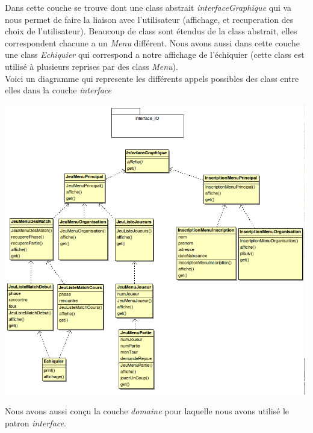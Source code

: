 \documentclass[10pt,a4paper]{report}
\begin{document}
Dans cette couche se trouve dont une class abstrait \textit{interfaceGraphique} qui va nous permet de faire la liaison avec l'utilisateur (affichage, et recuperation des choix de l'utilisateur). Beaucoup de class sont étendus de la class abstrait, elles correspondent chacune a un \textit{Menu} différent. Nous avons aussi dans cette couche une class \textit{Echiquier} qui correspond a notre affichage de l'échiquier (cette class est utilisé à plusieurs reprises par des class \textit{Menu}).\\
Voici un diagramme qui represente les différents appels possibles des class entre elles dans la couche \textit{interface}\\
\begin{center}
\includegraphics[width=18cm]{DiagLienJavaInterface.png}
\end{center}
\mbox{}\hspace{0.4cm}Nous avons aussi conçu la couche \textit{domaine} pour laquelle nous avons utilisé le patron \textit{interface}.\\
\end{document}
